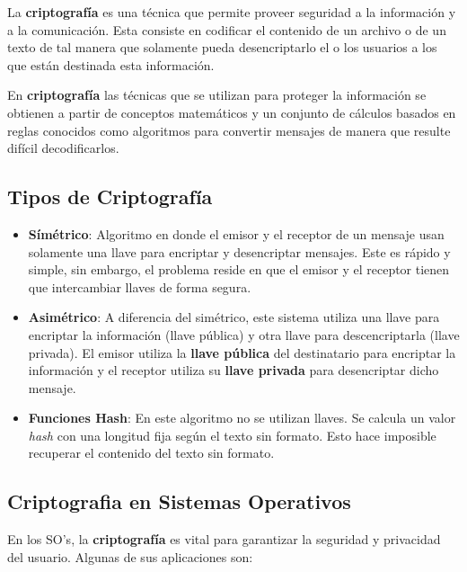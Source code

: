 \documentclass[12pt, a4paper]{article} %
\begin{document}
La \textbf{criptografía} es una técnica que permite proveer seguridad a la información y a la comunicación. Esta consiste en codificar el contenido de un archivo o de un texto de tal manera que solamente pueda desencriptarlo el o los usuarios a los que están destinada esta información.

En \textbf{criptografía} las técnicas que se utilizan para proteger la información se obtienen a partir de conceptos matemáticos y un conjunto de cálculos basados en reglas conocidos como algoritmos para convertir mensajes de manera que resulte difícil decodificarlos.

\subsection{Tipos de Criptografía}

\begin{itemize}
	\item \textbf{Símétrico}: Algoritmo en donde el emisor y el receptor de un mensaje usan solamente una llave para encriptar y desencriptar mensajes. Este es rápido y simple, sin embargo, el problema reside en que el emisor y el receptor tienen que intercambiar llaves de forma segura.
	
	\item \textbf{Asimétrico}: A diferencia del simétrico, este sistema utiliza una llave para encriptar la información (llave pública) y otra llave para descencriptarla (llave privada). El emisor utiliza la \textbf{llave pública} del destinatario para encriptar la información y el receptor utiliza su \textbf{llave privada} para desencriptar dicho mensaje.
	
	\item \textbf{Funciones Hash}: En este algoritmo no se utilizan llaves. Se calcula un valor \textit{hash} con una longitud fija según el texto sin formato. Esto hace imposible recuperar el contenido del texto sin formato.
\end{itemize}

\subsection{Criptografia en Sistemas Operativos}

En los SO's, la \textbf{criptografía} es vital para garantizar la seguridad y privacidad del usuario. Algunas de sus aplicaciones son:
\end{document}
